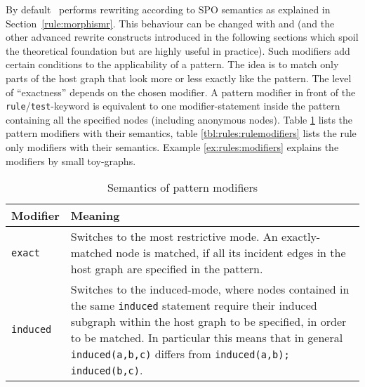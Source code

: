 By default \GrG\ performs rewriting according to SPO semantics as explained in Section~\ref{rule:morphismr}.
This behaviour can be changed with  and  (and the other advanced rewrite constructs introduced in the following sections which spoil the theoretical foundation but are highly useful in practice).
Such modifiers add certain conditions to the applicability of a pattern.
The idea is to match only parts of the host graph that look more or less exactly like the pattern.
The level of ``exactness'' depends on the chosen modifier.
A pattern modifier in front of the \texttt{rule}/\texttt{test}-keyword is equivalent to one modifier-statement inside the pattern containing all the specified nodes (including anonymous nodes).
Table \ref{tbl:rules:patternmodifiers} lists the pattern modifiers with their semantics, table \ref{tbl:rules:rulemodifiers} lists the rule only modifiers with their semantics.
Example \ref{ex:rules:modifiers} explains the modifiers by small toy-graphs.

\begin{table}[htbp]
    \begin{tabularx}{\linewidth}{l|X}
        \bf Modifier & \bf Meaning \\\hline
        \texttt{exact} & Switches to the most restrictive mode. An exactly-matched node is matched, if all its incident edges in the host graph are specified in the pattern.\\
        \texttt{induced} & Switches to the induced-mode, where nodes contained in the same \texttt{induced} statement require their induced subgraph within the host graph to be specified, in order to be matched. In particular this means that in general \texttt{induced(a,b,c)} differs from \texttt{induced(a,b); induced(b,c)}.\\
    \end{tabularx}
    \caption{Semantics of pattern modifiers}
    \label{tbl:rules:patternmodifiers}
\end{table}

